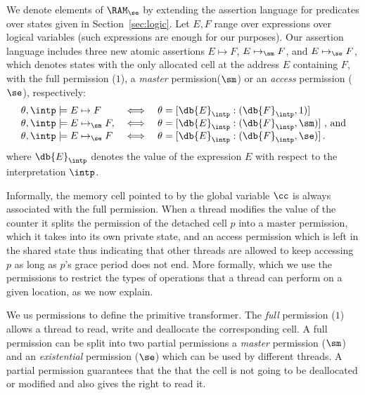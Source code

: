 We denote elements of $\RAM_{\se}$ by extending the assertion
language for predicates over states given in Section~\ref{sec:logic}.
Let $E, F$ range over expressions over logical
variables (such expressions are enough for our purposes).
Our  assertion language includes three new atomic assertions
$E \mapsto F$,  $E \mapsto_{\sm} F$, and $E \mapsto_{\se} F$, 
which denotes states with the only
allocated cell at the address $E$ containing $F$, with the full permission ($1$), 
a \emph{master} permission($\sm$) or an \emph{access} permission ($\se$), respectively:
$$
\begin{array}{lcl}
\theta,\intp \models E \mapsto F 
& 
\iff 
& 
\theta = [\db{E}_{\intp} : (\db{F}_{\intp},1)]
\\
\theta,\intp \models E \mapsto_{\sm} F, 
&
\iff 
& 
\theta = [\db{E}_{\intp} : (\db{F}_{\intp},\sm)]
~\text{, and}\\
\theta,\intp \models E \mapsto_{\se} F 
& 
\iff
& 
\theta = {[}\db{E}_{\intp} : (\db{F}_{\intp},\se)]\,.
\end{array}
$$
where $\db{E}_{\intp}$ denotes the value of the expression $E$ with respect to
the interpretation $\intp$.

% 
% 
Informally, the memory cell pointed to by the global variable $\cc$ is always 
associated with the  full permission. 
When a thread modifies the value of the counter it splits the 
permission of the detached cell $p$ into a master permission, which it takes into its own private state,
and an access permission which is left in the shared state thus indicating that other threads are 
allowed to 
keep accessing~$p$ as long as  $p$'s grace period does not end.
More formally, 
which we use the permissions to
restrict the types of operations that a thread can 
perform on a given location, as we now explain.


We us permissions to define the primitive transformer.
The {\em full} permission ($1$) allows a thread to
read, write and deallocate the corresponding cell. A full permission can be
split into two partial permissions a {\em master} permission ($\sm$) and an {\em existential} 
permission ($\se$) which can be used by different threads. 
A partial  permission guarantees that the that the cell is not going to be 
deallocated or modified and
also gives the right to read it.



